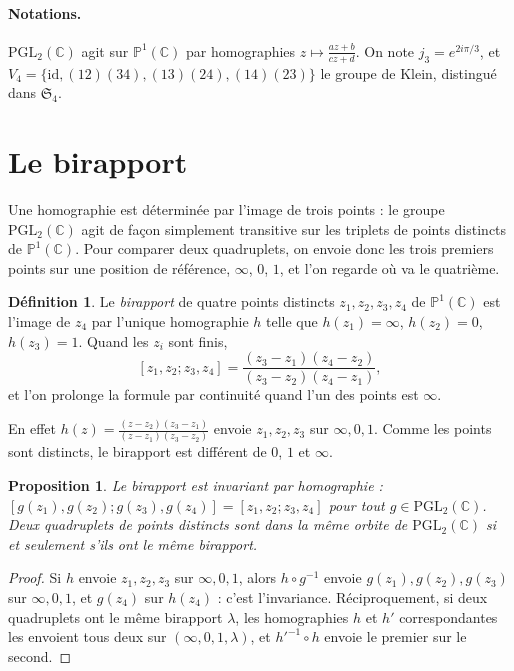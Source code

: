 \documentclass[11pt,a4paper]{article}
\theoremstyle{plain}
\newtheorem{proposition}[theoreme]{Proposition}
\theoremstyle{definition}
\newtheorem{definition}[theoreme]{Définition}
\theoremstyle{remark}
\newcommand{\C}{\mathbb{C}}
\newcommand{\Pu}{\mathbb{P}^1}
\newcommand{\PGL}{\mathrm{PGL}}
\newcommand{\Sym}{\mathfrak{S}}
\begin{document}
\paragraph{Notations.} $\PGL_2(\C)$ agit sur $\Pu(\C)$ par homographies $z\mapsto\frac{az+b}{cz+d}$. On note $j_3=e^{2i\pi/3}$, et $V_4=\{\mathrm{id},(12)(34),(13)(24),(14)(23)\}$ le groupe de Klein, distingué dans $\Sym_4$.

\tableofcontents

\section{Le birapport}

Une homographie est déterminée par l'image de trois points : le groupe $\PGL_2(\C)$ agit de façon simplement transitive sur les triplets de points distincts de $\Pu(\C)$. Pour comparer deux quadruplets, on envoie donc les trois premiers points sur une position de référence, $\infty$, $0$, $1$, et l'on regarde où va le quatrième.

\begin{definition}
Le \emph{birapport} de quatre points distincts $z_1,z_2,z_3,z_4$ de $\Pu(\C)$ est l'image de $z_4$ par l'unique homographie $h$ telle que $h(z_1)=\infty$, $h(z_2)=0$, $h(z_3)=1$. Quand les $z_i$ sont finis,
\[
  [z_1,z_2;z_3,z_4]=\frac{(z_3-z_1)(z_4-z_2)}{(z_3-z_2)(z_4-z_1)} ,
\]
et l'on prolonge la formule par continuité quand l'un des points est $\infty$.
\end{definition}

En effet $h(z)=\frac{(z-z_2)(z_3-z_1)}{(z-z_1)(z_3-z_2)}$ envoie $z_1,z_2,z_3$ sur $\infty,0,1$. Comme les points sont distincts, le birapport est différent de $0$, $1$ et $\infty$.

\begin{proposition}\label{prop:invariance}
Le birapport est invariant par homographie : $[g(z_1),g(z_2);g(z_3),g(z_4)]=[z_1,z_2;z_3,z_4]$ pour tout $g\in\PGL_2(\C)$. Deux quadruplets de points distincts sont dans la même orbite de $\PGL_2(\C)$ si et seulement s'ils ont le même birapport.
\end{proposition}

\begin{proof}
Si $h$ envoie $z_1,z_2,z_3$ sur $\infty,0,1$, alors $h\circ g^{-1}$ envoie $g(z_1),g(z_2),g(z_3)$ sur $\infty,0,1$, et $g(z_4)$ sur $h(z_4)$ : c'est l'invariance. Réciproquement, si deux quadruplets ont le même birapport $\lambda$, les homographies $h$ et $h'$ correspondantes les envoient tous deux sur $(\infty,0,1,\lambda)$, et $h'^{-1}\circ h$ envoie le premier sur le second.
\end{proof}
\end{document}

